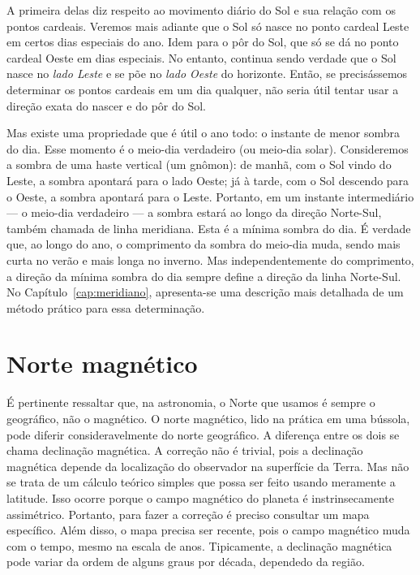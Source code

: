 A primeira delas diz respeito ao movimento diário do Sol e sua relação com os pontos cardeais. Veremos mais adiante que o Sol só nasce no ponto cardeal Leste em certos dias especiais do ano. Idem para o pôr do Sol, que só se dá no ponto cardeal Oeste em dias especiais. No entanto, continua sendo verdade que o Sol nasce no \textit{lado Leste} e se põe no \textit{lado Oeste} do horizonte. Então, se precisássemos determinar os pontos cardeais em um dia qualquer, não seria útil tentar usar a direção exata do nascer e do pôr do Sol.

Mas existe uma propriedade que é útil o ano todo: o instante de menor sombra do dia. Esse momento é o meio-dia verdadeiro (ou meio-dia solar). Consideremos a sombra de uma haste vertical (um gnômon): de manhã, com o Sol vindo do Leste, a sombra apontará para o lado Oeste; já à tarde, com o Sol descendo para o Oeste, a sombra apontará para o Leste. Portanto, em um instante intermediário --- o meio-dia verdadeiro --- a sombra estará ao longo da direção Norte-Sul, também chamada de linha meridiana. Esta é a mínima sombra do dia. É verdade que, ao longo do ano, o comprimento da sombra do meio-dia muda, sendo mais curta no verão e mais longa no inverno. Mas independentemente do comprimento, a direção da mínima sombra do dia sempre define a direção da linha Norte-Sul. No Capítulo~\ref{cap:meridiano}, apresenta-se uma descrição mais detalhada de um método prático para essa determinação.

\section{Norte magnético}

É pertinente ressaltar que, na astronomia, o Norte que usamos é sempre o geográfico, não o magnético. O norte magnético, lido na prática em uma bússola, pode diferir consideravelmente do norte geográfico. A diferença entre os dois se chama declinação magnética. A correção não é trivial, pois a declinação magnética depende da localização do observador na superfície da Terra. Mas não se trata de um cálculo teórico simples que possa ser feito usando meramente a latitude. Isso ocorre porque o campo magnético do planeta é instrinsecamente assimétrico. Portanto, para fazer a correção é preciso consultar um mapa específico. Além disso, o mapa precisa ser recente, pois o campo magnético muda com o tempo, mesmo na escala de anos. Tipicamente, a declinação magnética pode variar da ordem de alguns graus por década, dependedo da região.

